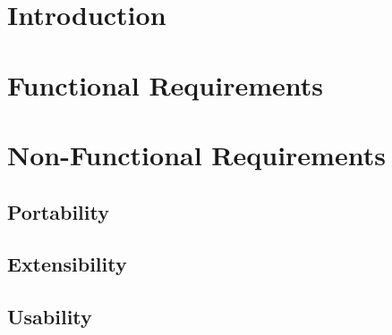 \section{Introduction}
	\paragraph{}{
	}		
\section{Functional Requirements}
	\paragraph{}{
	}
\section{Non-Functional Requirements}
	\subsection{Portability}
		\paragraph{}{
		}
	\subsection{Extensibility}
		\paragraph{}{
		}
	\subsection{Usability}
		\paragraph{}{
		}